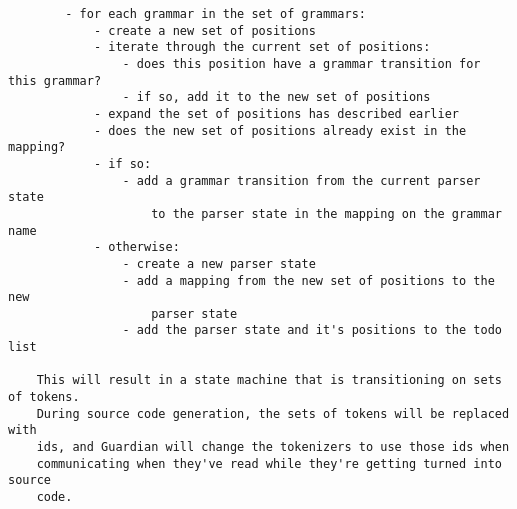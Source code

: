{\begin{verbatim}
		- for each grammar in the set of grammars:
			- create a new set of positions
			- iterate through the current set of positions:
				- does this position have a grammar transition for this grammar?
				- if so, add it to the new set of positions
			- expand the set of positions has described earlier
			- does the new set of positions already exist in the mapping?
			- if so:
				- add a grammar transition from the current parser state
					to the parser state in the mapping on the grammar name
			- otherwise:
				- create a new parser state
				- add a mapping from the new set of positions to the new
					parser state
				- add the parser state and it's positions to the todo list

	This will result in a state machine that is transitioning on sets of tokens.
	During source code generation, the sets of tokens will be replaced with
	ids, and Guardian will change the tokenizers to use those ids when
	communicating when they've read while they're getting turned into source
	code.
	\end{verbatim}
}
















